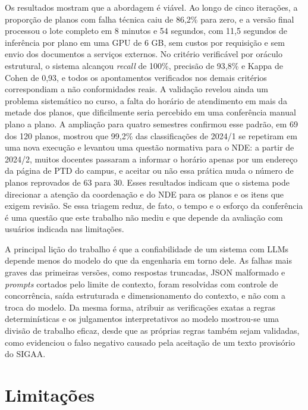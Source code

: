 Os resultados mostram que a abordagem é viável. Ao longo de cinco iterações, a proporção de planos com falha técnica caiu de 86,2\% para zero, e a versão final processou o lote completo em 8 minutos e 54 segundos, com 11,5 segundos de inferência por plano em uma GPU de 6 GB, sem custos por requisição e sem envio dos documentos a serviços externos. No critério verificável por oráculo estrutural, o sistema alcançou \textit{recall} de 100\%, precisão de 93,8\% e Kappa de Cohen de 0,93, e todos os apontamentos verificados nos demais critérios correspondiam a não conformidades reais. A validação revelou ainda um problema sistemático no curso, a falta do horário de atendimento em mais da metade dos planos, que dificilmente seria percebido em uma conferência manual plano a plano. A ampliação para quatro semestres confirmou esse padrão, em 69 dos 120 planos, mostrou que 99,2\% das classificações de 2024/1 se repetiram em uma nova execução e levantou uma questão normativa para o NDE: a partir de 2024/2, muitos docentes passaram a informar o horário apenas por um endereço da página de PTD do campus, e aceitar ou não essa prática muda o número de planos reprovados de 63 para 30. Esses resultados indicam que o sistema pode direcionar a atenção da coordenação e do NDE para os planos e os itens que exigem revisão. Se essa triagem reduz, de fato, o tempo e o esforço da conferência é uma questão que este trabalho não mediu e que depende da avaliação com usuários indicada nas limitações.

A principal lição do trabalho é que a confiabilidade de um sistema com LLMs depende menos do modelo do que da engenharia em torno dele. As falhas mais graves das primeiras versões, como respostas truncadas, JSON malformado e \textit{prompts} cortados pelo limite de contexto, foram resolvidas com controle de concorrência, saída estruturada e dimensionamento do contexto, e não com a troca do modelo. Da mesma forma, atribuir as verificações exatas a regras determinísticas e os julgamentos interpretativos ao modelo mostrou-se uma divisão de trabalho eficaz, desde que as próprias regras também sejam validadas, como evidenciou o falso negativo causado pela aceitação de um texto provisório do SIGAA.

\section{Limitações}

